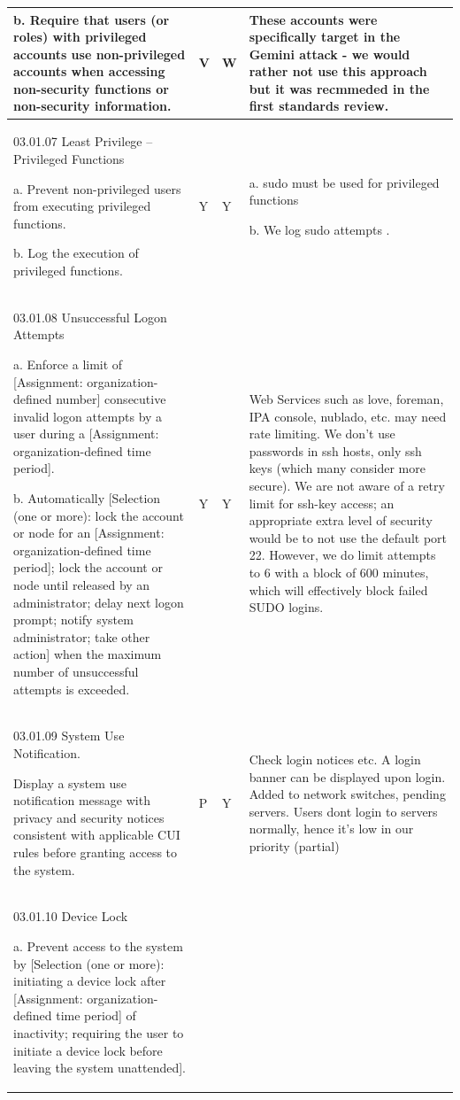 \begin{longtable} {|p{}|p{}|p{}|p{} |}
{b. Require that users (or roles) with privileged accounts use non-privileged accounts when accessing non-security functions or non-security information.
  }&{V}&{W}&{These accounts were specifically target in the Gemini attack - we would rather not use this approach but it was recmmeded in the first standards review. } \\ \hline
{03.01.07 Least Privilege – Privileged Functions

a. Prevent non-privileged users from executing privileged functions.

b. Log the execution of privileged functions.}&{Y}&{Y}&{a. sudo must be used for privileged functions

b. We log sudo attempts .} \\ \hline
{03.01.08 Unsuccessful Logon Attempts

a. Enforce a limit of [Assignment: organization-defined number] consecutive invalid logon attempts by a user during a [Assignment: organization-defined time period].

b. Automatically [Selection (one or more): lock the account or node for an [Assignment: organization-defined time period]; lock the account or node until released by an administrator; delay next logon prompt; notify system administrator; take other action] when the maximum number of unsuccessful attempts is exceeded.
}&{Y}&{Y}&{Web Services such as love, foreman, IPA console, nublado, etc. may need rate limiting.
We don't use passwords in ssh hosts, only ssh keys (which many consider more secure).
We are not aware of a retry limit for ssh-key access; an appropriate extra level of security would be to not use the default port 22. However, we do limit attempts to 6 with a block of 600 minutes, which will effectively block failed SUDO logins.} \\ \hline
{03.01.09 System Use Notification.

Display a system use notification message with privacy and security notices
consistent with applicable CUI rules before granting access to the system.}&{P}&{Y}&{Check login notices etc. A login banner can be displayed upon login. Added to network switches, pending servers. Users dont login to servers normally, hence it's low in our priority (partial)} \\ \hline
{03.01.10 Device Lock

a. Prevent access to the system by [Selection (one or more): initiating a device lock after [Assignment: organization-defined time period] of inactivity; requiring the user to initiate a device lock before leaving the system unattended].

}
\end{longtable}

